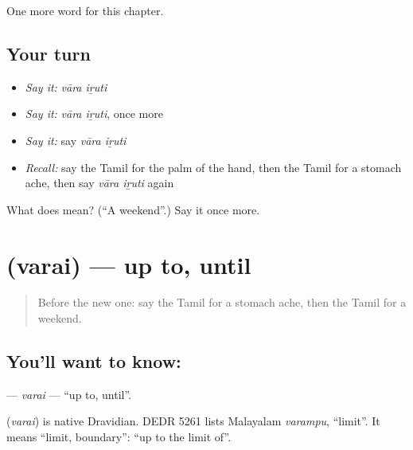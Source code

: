 \begin{grammarlens}[title={What you've built}]
One more word for this chapter.
\end{grammarlens}

\subsection*{Your turn}
\begin{itemize}
\raggedright
  \item \emph{Say it:} \emph{vāra iṟuti}
  \item \emph{Say it:} \emph{vāra iṟuti}, once more
  \item \emph{Say it:} say \emph{vāra iṟuti}
  \item \emph{Recall:} say the Tamil for the palm of the hand, then the Tamil for a stomach ache, then say \emph{vāra iṟuti} again
\end{itemize}

\begin{tcolorbox}[breakable,colback=teal!4,colframe=teal!35!black,title={Before you move on}]
What does   mean? (\textquotedblleft{}A weekend\textquotedblright{}.) Say it once more.
\end{tcolorbox}
\section[\texorpdfstring{\ta{வரை} (varai)}{வரை (varai)}]{ (varai) — up to, until}

\label{lesson:TA-C202-varai}



\begin{quote}
Before the new one: say the Tamil for a stomach ache, then the Tamil for a weekend.
\end{quote}

\subsection*{You'll want to know: }
\textbf{} — \emph{varai} — \textquotedblleft{}up to, until\textquotedblright{}.

\begin{cousinweb}
\textbf{} (\emph{varai}) is native Dravidian. DEDR 5261 lists Malayalam \emph{varampu}, \textquotedblleft{}limit\textquotedblright{}. It means \textquotedblleft{}limit, boundary\textquotedblright{}: \textquotedblleft{}up to the limit of\textquotedblright{}.
\end{cousinweb}

